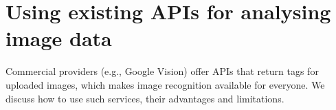 \section{Using existing APIs for analysing image data}
\label{sec:apivisions}

Commercial providers (e.g., Google Vision) offer APIs that return tags for uploaded images, which makes image recognition available for everyone. We discuss how to use such services, their advantages and limitations.